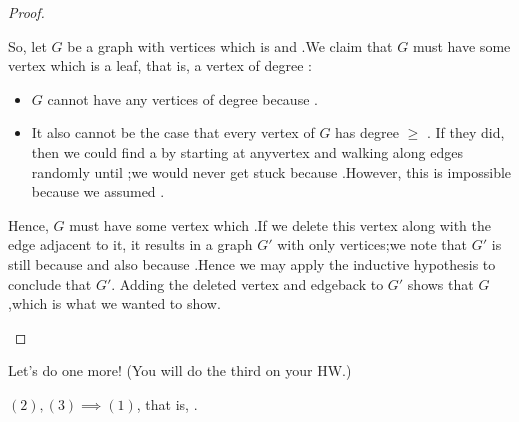 \documentclass{tufte-handout}
\begin{document}
\begin{proof}
\begin{itemize}
    So, let $G$ be a graph with \blank vertices which is\linebreak
    \mbox{}\blank and \blank.\linebreak  We claim that $G$
    must have some vertex which is a leaf, that is, a vertex of degree \blank:
    \begin{itemize}
    \item $G$ cannot have any vertices of degree \blank\linebreak because
      \blank.
    \item It also cannot be the case that every vertex of $G$ has
      degree $\geq$ \blank.  If they did, then we could find a \blank
      by starting at any\linebreak vertex and walking along edges
      randomly until \blank;\linebreak we would never get stuck
      because \blank.\linebreak However, this is impossible because we
      assumed \blank.
    \end{itemize}
    Hence, $G$ must have some vertex which \blank.\linebreak If we
    delete this vertex along with the edge adjacent to it, it results
    in a graph $G'$ with only \blank vertices;\linebreak we note that
    $G'$ is still \blank\linebreak because \blank\linebreak and also
    \blank\linebreak because \blank.\linebreak  Hence we may apply the
    inductive hypothesis to conclude that $G'$\linebreak \mbox{}\blank.
    Adding the deleted vertex and edge\linebreak back to $G'$ shows that $G$
    \blank,\linebreak which is what we wanted to show.
  \end{itemize}
\end{proof}

Let's do one more!  (You will do the third on your HW.)

\begin{lem}
  $(2),(3) \implies (1)$, that is, \blank\linebreak \mbox{}\blank.
\end{lem}
\end{document}
